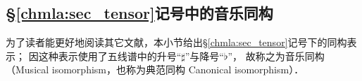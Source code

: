 




\subsection{\S\ref{chmla:sec_tensor}记号中的音乐同构}\label{chrg:sec_music-iso}
为了读者能更好地阅读其它文献，本小节给出\S\ref{chmla:sec_tensor}记号下的同构表示；
因这种表示使用了五线谱中的升号“$\sharp$”与降号“$\flat$”，
故称之为{\heiti 音乐同构}（Musical isomorphism，也称为典范同构 Canonical isomorphism）．


